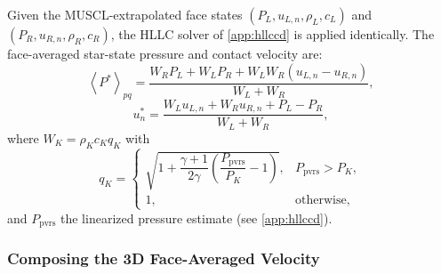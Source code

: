 \documentclass[twocolumn]{aastex63}
\newcommand{\vel}{{u}}
\begin{document}
Given the MUSCL-extrapolated face states
$(P_L, \vel_{L,n}, \rho_L, c_L)$ and
$(P_R, \vel_{R,n}, \rho_R, c_R)$,
the HLLC solver of \ref{app:hllccd} is applied
identically.
The face-averaged star-state pressure and contact velocity are:
\begin{equation}\label{eq:pstar3d}
  \left<P^*\right>_{pq}
  = \frac{W_R P_L + W_L P_R
    + W_L W_R(\vel_{L,n} - \vel_{R,n})}{W_L + W_R},
\end{equation}
\begin{equation}\label{eq:vstar3d}
  \vel^*_n
  = \frac{W_L\vel_{L,n} + W_R\vel_{R,n}
    + P_L - P_R}{W_L + W_R},
\end{equation}
where $W_K = \rho_K c_K q_K$ with
\begin{equation}
  q_K = \begin{cases}
    \sqrt{1 + \dfrac{\gamma+1}{2\gamma}
      \left(\dfrac{P_\textrm{pvrs}}{P_K}-1\right)},
    & P_\textrm{pvrs} > P_K, \\[6pt]
    1, & \text{otherwise},
  \end{cases}
\end{equation}
and $P_\textrm{pvrs}$ the linearized pressure estimate
(see \ref{app:hllccd}).

\subsubsection{Composing the 3D Face-Averaged Velocity}
\end{document}
